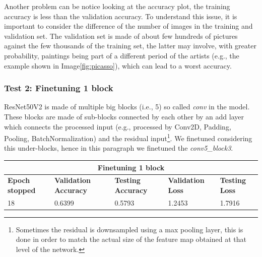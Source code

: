 Another problem can be notice looking at the accuracy plot, the training accuracy is less than the validation accuracy. To understand this issue, it is important to consider the difference of the number of images in the training and validation set. The validation set is made of about few hundreds of pictures against the few thousands of the training set, the latter may involve, with greater probability, paintings being part of a different period of the artists (e.g., the example shown in Image\ref{fig:picasso}), which can lead to a worst accuracy.


\subsubsection{Test 2: Finetuning 1 block}
ResNet50V2 is made of multiple big blocks (i.e., 5) so called \textit{conv} in the model. These blocks are made of sub-blocks connected by each other by an add layer which connects the processed input (e.g., processed by Conv2D, Padding, Pooling, BatchNormalization) and the residual input\footnote{Sometimes the residual is downsampled using a max pooling layer, this is done in order to match the actual size of the feature map obtained at that level of the network.}. We finetuned considering this under-blocks, hence in this paragraph we finetuned the \textit{conv5\_block3}.

\medskip

\begin{tabular}{ |p{2cm}|p{2cm}|p{2cm}|p{2cm}|p{2cm}|  }
\hline
\multicolumn{5}{|c|}{Finetuning 1 block} \\
\hline
\textbf{Epoch stopped} & \textbf{Validation Accuracy} & \textbf{Testing Accuracy} & \textbf{Validation Loss} & \textbf{Testing Loss} \\
\hline
18 & 0.6399 & 0.5793 & 1.2453 & 1.7916\\
\hline
\end{tabular}

